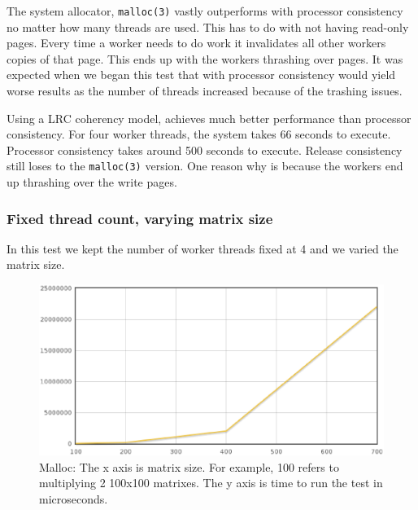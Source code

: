 The system allocator, \verb,malloc(3), vastly outperforms \projname{} with processor consistency no matter how many threads are used.  This has to do with not having read-only pages.  Every time a worker needs to do work it invalidates all other workers copies of that page.  This ends up with the workers thrashing over pages.  It was expected when we began this test that \projname{} with processor consistency would yield worse results as the number of threads increased because of the trashing issues.

Using a LRC coherency model, \projname{} achieves much better performance than processor consistency.  For four worker threads, the system takes 66 seconds to execute.  Processor consistency takes around 500 seconds to execute.  Release consistency still loses to the \verb,malloc(3), version.  One reason why is because the workers end up thrashing over the write pages.

\subsubsection{Fixed thread count, varying matrix size}

In this test we kept the number of worker threads fixed at 4 and we varied the matrix size.

\begin{figure}[!h]
\centering
\includegraphics[scale=0.40]{images/malloc-fixed-thread.eps}
\caption{Malloc: The x axis is matrix size. For example, 100 refers to multiplying 2 100x100 matrixes. The y axis is time to run the test in microseconds.}
\end{figure}

